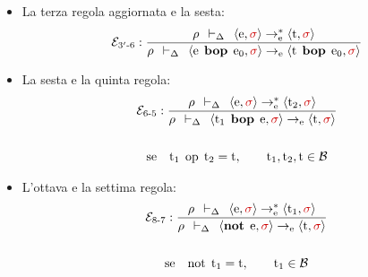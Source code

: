 \documentclass[a4paper]{article}
\begin{document}
\begin{itemize}
 		\item La terza regola aggiornata e la sesta:
 		\begin{equation*}
 			\mathcal{E}_{3'\text{-}6} : \dfrac{
 				\rho \:\: \vdash_{\Delta} \:\: \left\langle \mathrm{e}, \textcolor{Red3}{\sigma} \right\rangle \rightarrow_{\mathrm{e}}^{*} \left\langle \mathrm{t}, \textcolor{Red3}{\sigma} \right\rangle
 			}{
 				\rho \:\: \vdash_{\Delta} \:\: \left\langle \mathrm{e} \:\: \mathbf{bop} \:\: \mathrm{e}_{0}, \textcolor{Red3}{\sigma} \right\rangle \rightarrow_{\mathrm{e}} \left\langle \mathrm{t} \:\: \mathbf{bop} \:\: \mathrm{e}_{0}, \textcolor{Red3}{\sigma} \right\rangle
 			}
 		\end{equation*}
 		
 		\item La sesta e la quinta regola:
 		\begin{gather*}
 			\mathcal{E}_{6\text{-}5} : \dfrac{
 				\rho \:\: \vdash_{\Delta} \:\: \left\langle \mathrm{e}, \textcolor{Red3}{\sigma} \right\rangle \rightarrow_{\mathrm{e}}^{*} \left\langle \mathrm{t}_{2}, \textcolor{Red3}{\sigma} \right\rangle
 			}{
 				\rho \:\: \vdash_{\Delta} \:\: \left\langle \mathrm{t}_{1} \:\: \mathbf{bop} \:\: \mathrm{e}, \textcolor{Red3}{\sigma} \right\rangle \rightarrow_{\mathrm{e}} \left\langle \mathrm{t}, \textcolor{Red3}{\sigma} \right\rangle
 			} \\
 			\\
 			\mathrm{se} \hspace{1em} \mathrm{t}_{1} \:\: \mathrm{op} \:\: \mathrm{t}_{2} = \mathrm{t}, \hspace{2em} \mathrm{t_{1}, t_{2}, t} \in \mathcal{B}
 		\end{gather*}
 		
 		\item L'ottava e la settima regola:
 		\begin{gather*}
 			\mathcal{E}_{8\text{-}7} : \dfrac{
 				\rho \:\: \vdash_{\Delta} \:\: \left\langle \mathrm{e}, \textcolor{Red3}{\sigma} \right\rangle \rightarrow_{\mathrm{e}}^{*} \left\langle \mathrm{t}_{1}, \textcolor{Red3}{\sigma} \right\rangle
 			}{
 				\rho \:\: \vdash_{\Delta} \:\: \left\langle \mathbf{not} \:\: \mathrm{e}, \textcolor{Red3}{\sigma} \right\rangle \rightarrow_{\mathrm{e}} \left\langle \mathrm{t}, \textcolor{Red3}{\sigma} \right\rangle
 			} \\
 			\\
 			\mathrm{se} \hspace{1em} \mathrm{not} \:\: \mathrm{t}_{1} = \mathrm{t}, \hspace{2em} \mathrm{t}_{1} \in \mathcal{B}
 		\end{gather*}
 	\end{itemize}\newpage
 	
\end{document}
